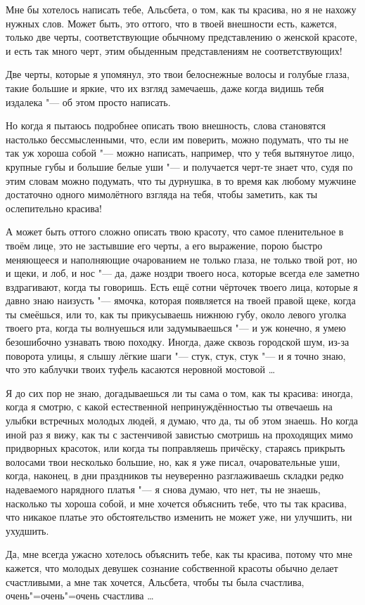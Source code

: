 Мне бы хотелось написать тебе, Альсбета, о том, как ты красива, но я не нахожу
нужных слов.
Может быть, это оттого, что в твоей внешности есть, кажется, только две черты,
соответствующие обычному представлению о женской красоте, и есть так много черт,
этим обыденным представлениям не соответствующих!

Две черты, которые я упомянул, это твои белоснежные волосы и голубые глаза,
такие большие и яркие, что их взгляд замечаешь, даже когда видишь тебя издалека
"--- об этом просто написать.

Но когда я пытаюсь подробнее описать твою внешность, слова становятся настолько
бессмысленными, что, если им поверить, можно подумать, что ты не так уж хороша
собой "--- можно написать, например, что у тебя вытянутое лицо, крупные губы и
большие белые уши "--- и получается черт-те знает что, судя по этим словам можно
подумать, что ты дурнушка, в то время как любому мужчине достаточно одного
мимолётного взгляда на тебя, чтобы заметить, как ты ослепительно красива!

А может быть оттого сложно описать твою красоту, что самое пленительное в твоём
лице, это не застывшие его черты, а его выражение, порою быстро меняющееся и
наполняющие очарованием не только глаза, не только твой рот, но и щеки, и лоб,
и нос "--- да, даже ноздри твоего носа, которые всегда еле заметно вздрагивают,
когда ты говоришь.
Есть ещё сотни чёрточек твоего лица, которые я давно знаю наизусть "--- ямочка,
которая появляется на твоей правой щеке, когда ты смеёшься, или то, как ты
прикусываешь нижнюю губу, около левого уголка твоего рта, когда ты волнуешься
или задумываешься "--- и уж конечно, я умею безошибочно узнавать твою походку.
Иногда, даже сквозь городской шум, из-за поворота улицы, я слышу лёгкие шаги
"--- стук, стук, стук "--- и я точно знаю, что это каблучки твоих туфель
касаются неровной мостовой \ldots

Я до сих пор не знаю, догадываешься ли ты сама о том, как ты красива: иногда,
когда я смотрю, с какой естественной непринуждённостью ты отвечаешь на улыбки
встречных молодых людей, я думаю, что да, ты об этом знаешь.
Но когда иной раз я вижу, как ты с застенчивой завистью смотришь на проходящих
мимо придворных красоток, или когда ты поправляешь причёску, стараясь прикрыть
волосами твои несколько большие, но, как я уже писал, очаровательные уши, когда,
наконец, в дни праздников ты неуверенно разглаживаешь складки редко надеваемого
нарядного платья "--- я снова думаю, что нет, ты не знаешь, насколько ты хороша
собой, и мне хочется объяснить тебе, что ты так красива, что никакое платье это
обстоятельство изменить не может уже, ни улучшить, ни ухудшить.

Да, мне всегда ужасно хотелось объяснить тебе, как ты красива, потому что мне
кажется, что молодых девушек сознание собственной красоты обычно делает
счастливыми, а мне так хочется, Альсбета, чтобы ты была счастлива,
очень"=очень"=очень счастлива \ldots
